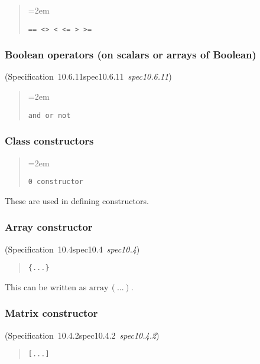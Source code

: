\documentclass[10pt,b5paper]{article}
\def\specrefx#1#2{Specification~#1\ifx\relax#2\relax{}\else~{\it{}#2}\fi}
\def\specref#1{\specrefx{#1}{\csname spec#1\endcsname}}
\begin{document}
\begin{quote}
\spaceskip=2em
\begin{verbatim}
== <> < <= > >=
\end{verbatim}
\end{quote}

\subsubsection*{Boolean operators (on scalars or arrays of Boolean)}

(\specref{10.6.11}\/)

\begin{quote}
\spaceskip=2em
\begin{verbatim}
and or not
\end{verbatim}
\end{quote}

\subsubsection*{Class constructors}

\begin{quote}
\spaceskip=2em
\begin{verbatim}
0 constructor
\end{verbatim}
\end{quote}

\noindent These are used in defining constructors.

\subsubsection*{Array constructor}
(\specref{10.4}\/)

\begin{quote}
\begin{verbatim}
{...}
\end{verbatim}
\end{quote}

\noindent This can be written as $\mathrm{array}\,(...)$.

\subsubsection*{Matrix constructor}
(\specref{10.4.2}\/)

\begin{quote}
\begin{verbatim}
[...]
\end{verbatim}
\end{quote}
\end{document}
